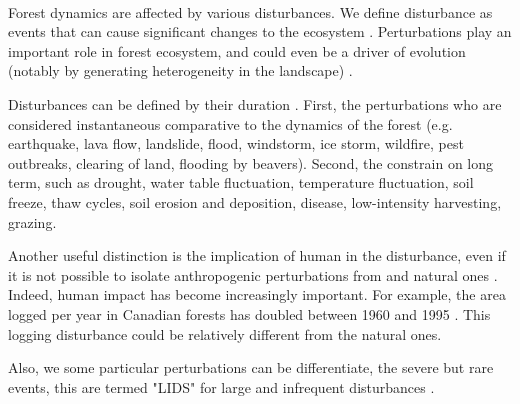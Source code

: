 \documentclass{article}
\begin{document}
\paragraph{}

Forest dynamics are affected by various disturbances. We define disturbance as events that can cause significant changes to the ecosystem \cite{white1985natural} \cite{rykiel1985towards}. Perturbations play an important role in forest ecosystem, and could even be a driver of evolution (notably by generating heterogeneity in the landscape) \cite{turner2010disturbance}.

Disturbances can be defined by their duration \cite{perera2015simulation}. First, the perturbations who are considered instantaneous comparative to the dynamics of the forest 
(e.g. earthquake, lava flow, landslide, flood, windstorm, ice storm, wildfire, pest outbreaks, clearing of land, flooding by beavers).
Second, the constrain on long term, such as drought, water table fluctuation, temperature fluctuation, soil freeze, thaw cycles, soil erosion and deposition, disease, low-intensity harvesting, grazing.

Another useful distinction is the implication of human in the disturbance, even if it is not possible to isolate anthropogenic perturbations from and natural ones \cite{perera2015simulation}.
Indeed, human impact has become increasingly important.
For example, the area logged per year in Canadian forests has doubled between 1960 and 1995 \cite{smith_canadas_2000}. This logging disturbance could be relatively different from the natural ones.

Also, we some particular perturbations can be differentiate, the severe but rare events, this are termed "LIDS" for large and infrequent disturbances \cite{foster1998landscape}.
\end{document}
